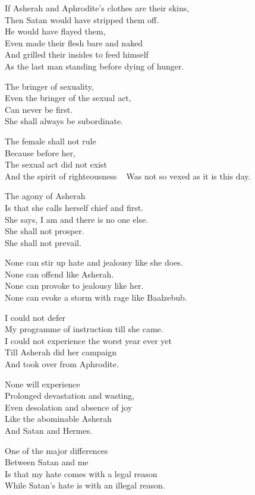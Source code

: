 \documentclass[
]{book}
\begin{document}
If Asherah and Aphrodite's clothes are their skins,\\
Then Satan would have stripped them off.\\
He would have flayed them,\\
Even made their flesh bare and naked\\
And grilled their insides to feed himself\\
As the last man standing before dying of hunger.

The bringer of sexuality,\\
Even the bringer of the sexual act,\\
Can never be first.\\
She shall always be subordinate.

The female shall not rule\\
Because before her,\\
The sexual act did not exist\\
And the spirit of righteousness ~
Was not so vexed as it is this day.

The agony of Asherah\\
Is that she calls herself chief and first.\\
She says, I am and there is no one else.\\
She shall not prosper.\\
She shall not prevail.

None can stir up hate and jealousy like she does.\\
None can offend like Asherah.\\
None can provoke to jealousy like her.\\
None can evoke a storm with rage like Baalzebub.

I could not defer\\
My programme of instruction till she came.\\
I could not experience the worst year ever yet\\
Till Asherah did her campaign\\
And took over from Aphrodite.

None will experience\\
Prolonged devastation and wasting,\\
Even desolation and absence of joy\\
Like the abominable Asherah\\
And Satan and Hermes.

One of the major differences\\
Between Satan and me\\
Is that my hate comes with a legal reason\\
While Satan's hate is with an illegal reason.
\end{document}
